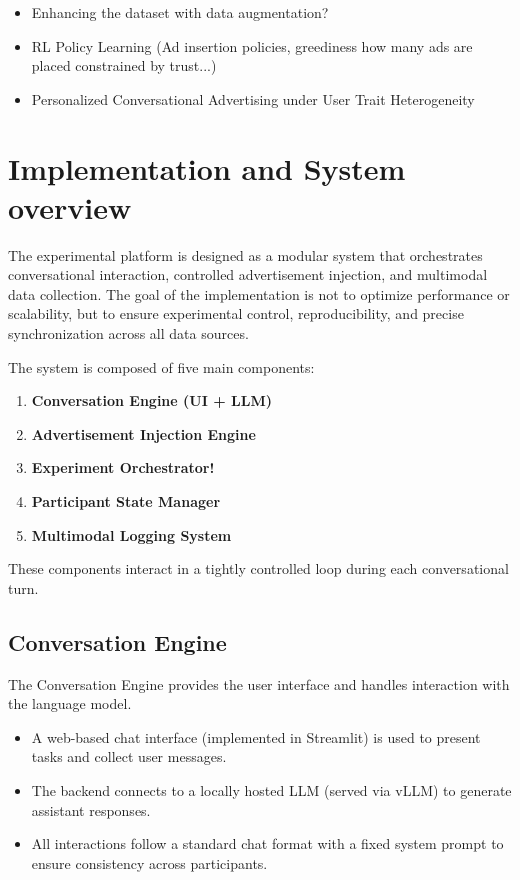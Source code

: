 \documentclass{article}
\begin{document}
\begin{itemize}
    \item Enhancing the dataset with data augmentation?
    \item RL Policy Learning (Ad insertion policies, greediness how many ads are placed constrained by trust...)
    \item Personalized Conversational Advertising under User Trait Heterogeneity
\end{itemize}

\newpage

\section{Implementation and System overview}

The experimental platform is designed as a modular system that orchestrates conversational interaction, controlled advertisement injection, and multimodal data collection. The goal of the implementation is not to optimize performance or scalability, but to ensure experimental control, reproducibility, and precise synchronization across all data sources.

The system is composed of five main components:

\begin{enumerate}
    \item \textbf{Conversation Engine (UI + LLM)}
    \item \textbf{Advertisement Injection Engine}
    \item \textbf{Experiment Orchestrator!}
    \item \textbf{Participant State Manager}
    \item \textbf{Multimodal Logging System}
\end{enumerate}

These components interact in a tightly controlled loop during each conversational turn.

\vspace{0.3cm}

\subsection{Conversation Engine}

The Conversation Engine provides the user interface and handles interaction with the language model.

\begin{itemize}
    \item A web-based chat interface (implemented in Streamlit) is used to present tasks and collect user messages.
    \item The backend connects to a locally hosted LLM (served via vLLM) to generate assistant responses.
    \item All interactions follow a standard chat format with a fixed system prompt to ensure consistency across participants.
\end{itemize}
\end{document}
